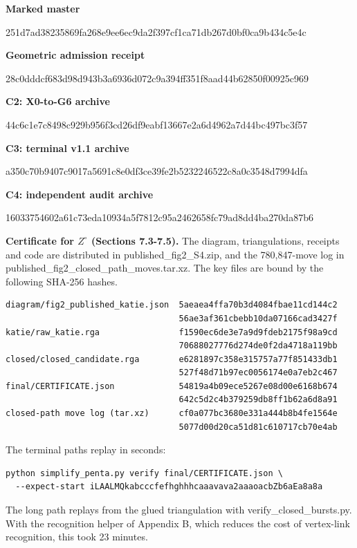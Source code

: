 \documentclass[11pt,letterpaper]{article}
\begin{document}
\smallskip\textbf{Marked master}\par
{\small\ttfamily 251d7ad38235869fa268e9ee6ec9da2f397cf1ca71db267d0bf0ca9b434c5e4c\par}
\smallskip\textbf{Geometric admission receipt}\par
{\small\ttfamily 28c0dddcf683d98d943b3a6936d072c9a394ff351f8aad44b62850f00925c969\par}
\smallskip\textbf{C2: X0-to-G6 archive}\par
{\small\ttfamily 44c6c1e7c8498c929b956f3cd26df9eabf13667e2a6d4962a7d44bc497bc3f57\par}
\smallskip\textbf{C3: terminal v1.1 archive}\par
{\small\ttfamily a350c70b9407c9017a5691c8e0df3ce39fe2b5232246522c8a0c3548d7994dfa\par}
\smallskip\textbf{C4: independent audit archive}\par
{\small\ttfamily 16033754602a61c73eda10934a5f7812c95a2462658fc79ad8dd4ba270da87b6\par}
\smallskip\textbf{Certificate for $Z^\circ$ (Sections 7.3-7.5).} The diagram, triangulations, receipts and code are distributed in published\_fig2\_S4.zip, and the 780,847-move log in published\_\allowbreak fig2\_\allowbreak closed\_\allowbreak path\_\allowbreak moves.tar.xz. The key files are bound by the following SHA-256 hashes.
\begin{Verbatim}
diagram/fig2_published_katie.json  5aeaea4ffa70b3d4084fbae11cd144c2
                                   56ae3af361cbebb10da07166cad3427f
katie/raw_katie.rga                f1590ec6de3e7a9d9fdeb2175f98a9cd
                                   70688027776d274de0f2da4718a119bb
closed/closed_candidate.rga        e6281897c358e315757a77f851433db1
                                   527f48d71b97ec0056174e0a7eb2c467
final/CERTIFICATE.json             54819a4b09ece5267e08d00e6168b674
                                   642c5d2c4b379259db8ff1b62a6d8a91
closed-path move log (tar.xz)      cf0a077bc3680e331a444b8b4fe1564e
                                   5077d00d20ca51d81c610717cb70e4ab
\end{Verbatim}
The terminal paths replay in seconds:
\begin{Verbatim}
python simplify_penta.py verify final/CERTIFICATE.json \
  --expect-start iLAALMQkabcccfefhghhhcaaavava2aaaoacbZb6aEa8a8a
\end{Verbatim}
The long path replays from the glued triangulation with verify\_closed\_bursts.py. With the recognition helper of Appendix B, which reduces the cost of vertex-link recognition, this took 23 minutes.
\end{document}
